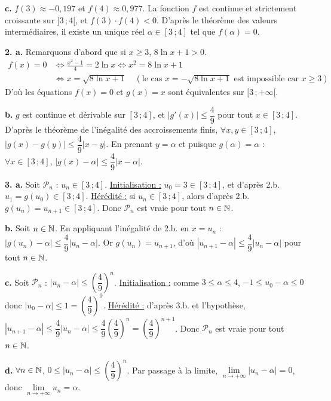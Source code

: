 \documentclass[11pt]{article}
\begin{document}
\textbf{c.} $f(3) \approx -0{,}197$ et $f(4) \approx 0{,}977$. La fonction $f$ est continue et strictement croissante sur $]3\,;4[$, et $f(3) \cdot f(4) < 0$. D'après le théorème des valeurs intermédiaires, il existe un unique réel $\alpha \in [3\,;4]$ tel que $f(\alpha) = 0$.

\textbf{2. a.} Remarquons d'abord que si $x \ge 3$, $8\ln x + 1 > 0$.
\begin{align*}
f(x) = 0 &\Longleftrightarrow \frac{x^2 - 1}{4} = 2\ln x \Longleftrightarrow x^2 = 8\ln x + 1 \\
&\Longleftrightarrow x = \sqrt{8\ln x + 1} \quad (\text{le cas } x = -\sqrt{8\ln x + 1} \text{ est impossible car } x \ge 3)
\end{align*}
D'où les équations $f(x) = 0$ et $g(x) = x$ sont équivalentes sur $[3\,;+\infty[$.

\textbf{b.} $g$ est continue et dérivable sur $[3\,;4]$, et $|g'(x)| \le \dfrac{4}{9}$ pour tout $x \in [3\,;4]$. D'après le théorème de l'inégalité des accroissements finis, $\forall x, y \in [3\,;4]$, $|g(x) - g(y)| \le \dfrac{4}{9}|x - y|$. En prenant $y = \alpha$ et puisque $g(\alpha) = \alpha$ : $\forall x \in [3\,;4]$, $|g(x) - \alpha| \le \dfrac{4}{9}|x - \alpha|$.

\textbf{3. a.} Soit $\mathcal{P}_n$ : $u_n \in [3\,;4]$. \underline{Initialisation :} $u_0 = 3 \in [3\,;4]$, et d'après 2.b. $u_1 = g(u_0) \in [3\,;4]$. \underline{Hérédité :} si $u_n \in [3\,;4]$, alors d'après 2.b. $g(u_n) = u_{n+1} \in [3\,;4]$. Donc $\mathcal{P}_n$ est vraie pour tout $n \in \mathbb{N}$.

\textbf{b.} Soit $n \in \mathbb{N}$. En appliquant l'inégalité de 2.b. en $x = u_n$ : $|g(u_n) - \alpha| \le \dfrac{4}{9}|u_n - \alpha|$. Or $g(u_n) = u_{n+1}$, d'où $|u_{n+1} - \alpha| \le \dfrac{4}{9}|u_n - \alpha|$ pour tout $n \in \mathbb{N}$.

\textbf{c.} Soit $\mathcal{P}_n$ : $|u_n - \alpha| \le \left(\dfrac{4}{9}\right)^n$. \underline{Initialisation :} comme $3 \le \alpha \le 4$, $-1 \le u_0 - \alpha \le 0$ donc $|u_0 - \alpha| \le 1 = \left(\dfrac{4}{9}\right)^0$. \underline{Hérédité :} d'après 3.b. et l'hypothèse, $|u_{n+1} - \alpha| \le \dfrac{4}{9}|u_n - \alpha| \le \dfrac{4}{9}\left(\dfrac{4}{9}\right)^n = \left(\dfrac{4}{9}\right)^{n+1}$. Donc $\mathcal{P}_n$ est vraie pour tout $n \in \mathbb{N}$.

\textbf{d.} $\forall n \in \mathbb{N}$, $0 \le |u_n - \alpha| \le \left(\dfrac{4}{9}\right)^n$. Par passage à la limite, $\lim\limits_{n\to+\infty}|u_n - \alpha| = 0$, donc $\lim\limits_{n\to+\infty} u_n = \alpha$.
\end{document}
